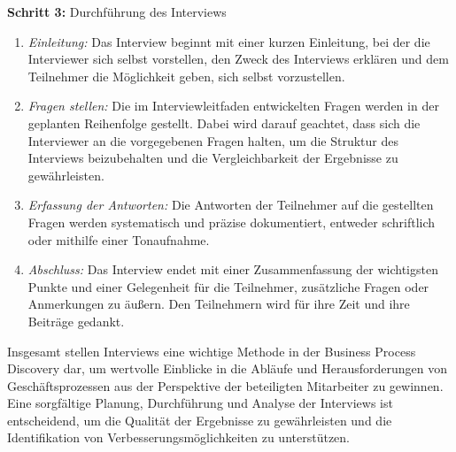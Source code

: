 \textbf{Schritt 3:} Durchführung des Interviews
\begin{enumerate}
\item \textit{Einleitung:} Das Interview beginnt mit einer kurzen Einleitung, bei der die Interviewer sich selbst vorstellen, den Zweck des Interviews erklären und dem Teilnehmer die Möglichkeit geben, sich selbst vorzustellen.
\item \textit{Fragen stellen:} Die im Interviewleitfaden entwickelten Fragen werden in der geplanten Reihenfolge gestellt. Dabei wird darauf geachtet, dass sich die Interviewer an die vorgegebenen Fragen halten, um die Struktur des Interviews beizubehalten und die Vergleichbarkeit der Ergebnisse zu gewährleisten.
\item \textit{Erfassung der Antworten:} Die Antworten der Teilnehmer auf die gestellten Fragen werden systematisch und präzise dokumentiert, entweder schriftlich oder mithilfe einer Tonaufnahme.
\item \textit{Abschluss:} Das Interview endet mit einer Zusammenfassung der wichtigsten Punkte und einer Gelegenheit für die Teilnehmer, zusätzliche Fragen oder Anmerkungen zu äußern. Den Teilnehmern wird für ihre Zeit und ihre Beiträge gedankt.
\end{enumerate}

Insgesamt stellen Interviews eine wichtige Methode in der Business Process Discovery dar, um wertvolle Einblicke in die Abläufe und Herausforderungen von Geschäftsprozessen aus der Perspektive der beteiligten Mitarbeiter zu gewinnen. Eine sorgfältige Planung, Durchführung und Analyse der Interviews ist entscheidend, um die Qualität der Ergebnisse zu gewährleisten und die Identifikation von Verbesserungsmöglichkeiten zu unterstützen.